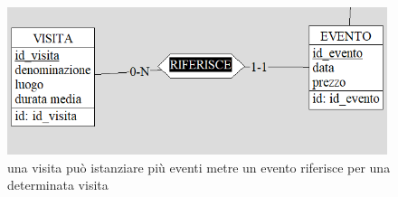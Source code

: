 \documentclass[a4paper,12pt]{report}
\begin{document}




\begin{figure}[H]
	\centering
	\includegraphics[width=0.99\textwidth]{visita-evento.png}
	\caption[short]{una visita può istanziare più eventi metre
		un evento riferisce per una determinata visita}
\end{figure}
\newpage
\end{document}
